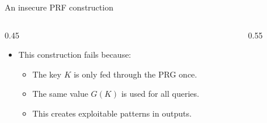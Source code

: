 \ifdefined\PRESENTATION\else\PassOptionsToClass{handout}{beamer}\fi\documentclass[aspectratio=169, lualatex]{beamer}
\begin{document}
\begin{frame}{An insecure PRF construction}
	\begin{columns}[c]
		\begin{column}{0.45\textwidth}
			\begin{itemize}[<+->]
				\item This construction fails because:
				      \begin{itemize}
					      \item The key $K$ is only fed through the PRG once.
					      \item The same value $G(K)$ is used for all queries.
					      \item This creates exploitable patterns in outputs.
				      \end{itemize}
			\end{itemize}
		\end{column}
		\begin{column}{0.55\textwidth}
			\begin{center}
			\end{center}
		\end{column}
	\end{columns}
\end{frame}
\end{document}
